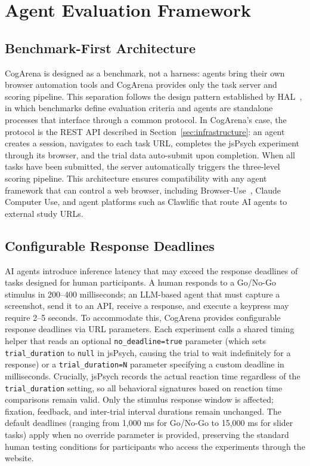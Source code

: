 \documentclass{article}
\begin{document}
\section{Agent Evaluation Framework}
\label{sec:agents}

\subsection{Benchmark-First Architecture}

CogArena is designed as a benchmark, not a harness: agents bring their own browser automation tools and CogArena provides only the task server and scoring pipeline. This separation follows the design pattern established by HAL~\citep{arora2025hal}, in which benchmarks define evaluation criteria and agents are standalone processes that interface through a common protocol. In CogArena's case, the protocol is the REST API described in Section~\ref{sec:infrastructure}: an agent creates a session, navigates to each task URL, completes the jsPsych experiment through its browser, and the trial data auto-submit upon completion. When all tasks have been submitted, the server automatically triggers the three-level scoring pipeline. This architecture ensures compatibility with any agent framework that can control a web browser, including Browser-Use~\citep{browseruse2024}, Claude Computer Use, and agent platforms such as Clawlific that route AI agents to external study URLs.

\subsection{Configurable Response Deadlines}

AI agents introduce inference latency that may exceed the response deadlines of tasks designed for human participants. A human responds to a Go/No-Go stimulus in 200--400 milliseconds; an LLM-based agent that must capture a screenshot, send it to an API, receive a response, and execute a keypress may require 2--5 seconds. To accommodate this, CogArena provides configurable response deadlines via URL parameters. Each experiment calls a shared timing helper that reads an optional \texttt{no\_deadline=true} parameter (which sets \texttt{trial\_duration} to \texttt{null} in jsPsych, causing the trial to wait indefinitely for a response) or a \texttt{trial\_duration=N} parameter specifying a custom deadline in milliseconds. Crucially, jsPsych records the actual reaction time regardless of the \texttt{trial\_duration} setting, so all behavioral signatures based on reaction time comparisons remain valid. Only the stimulus response window is affected; fixation, feedback, and inter-trial interval durations remain unchanged. The default deadlines (ranging from 1,000 ms for Go/No-Go to 15,000 ms for slider tasks) apply when no override parameter is provided, preserving the standard human testing conditions for participants who access the experiments through the website.
\end{document}
